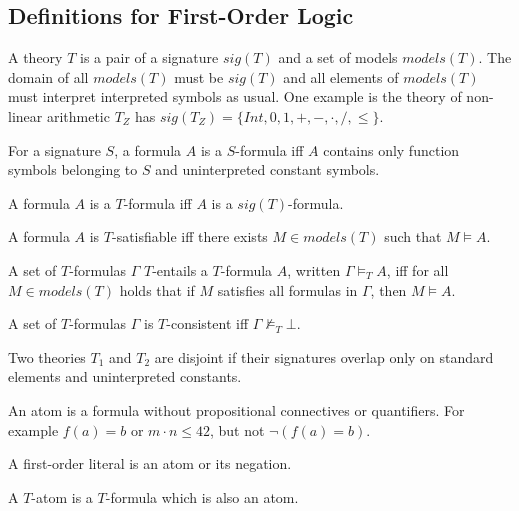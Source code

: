 \subsection{Definitions for First-Order Logic}
\begin{mytitle}[Theory] A theory $T$ is a pair of a signature $sig(T)$ and a set of models $models(T)$. The domain of all $models(T)$ must be $sig(T)$ and all elements of $models(T)$ must interpret interpreted symbols as usual. One example is the theory of non-linear arithmetic $T_Z$ has $sig(T_Z)=\{Int, 0, 1, +, -, \cdot, /, \le\}$.
\end{mytitle}
\begin{mytitle}[$S$-formula] For a signature $S$, a formula $A$ is a $S$-formula iff $A$ contains only function symbols belonging to $S$ and uninterpreted constant symbols.
\end{mytitle}
\begin{mytitle}[$T$-formula] A formula $A$ is a $T$-formula iff $A$ is a $sig(T)$-formula.
\end{mytitle}
\begin{mytitle}[$T$-satisfiability] A formula $A$ is $T$-satisfiable iff there exists $M\in models(T)$ such that $M\models A$.
\end{mytitle}
\begin{mytitle}[$T$-entailment] A set of $T$-formulas $\Gamma$ $T$-entails a $T$-formula $A$, written $\Gamma \models_T A$, iff for all $M\in models(T)$ holds that if $M$ satisfies all formulas in $\Gamma$, then $M\models A$.
\end{mytitle}
\begin{mytitle}[$T$-consistency] A set of $T$-formulas $\Gamma$ is $T$-consistent iff $\Gamma \not\models_T \bot$.
\end{mytitle}
\begin{mytitle}[Disjointedness] Two theories $T_1$ and $T_2$ are disjoint if their signatures overlap only on standard elements and uninterpreted constants.
\end{mytitle}
\begin{mytitle}[Atom] An atom is a formula without propositional connectives or quantifiers. For example $f(a) = b$ or $m\cdot n \le 42$, but not $\lnot(f(a)=b)$.
\end{mytitle}
\begin{mytitle} A first-order literal is an atom or its negation.
\end{mytitle}
\begin{mytitle}[$T$-atom] A $T$-atom is a $T$-formula which is also an atom. 
\end{mytitle}
